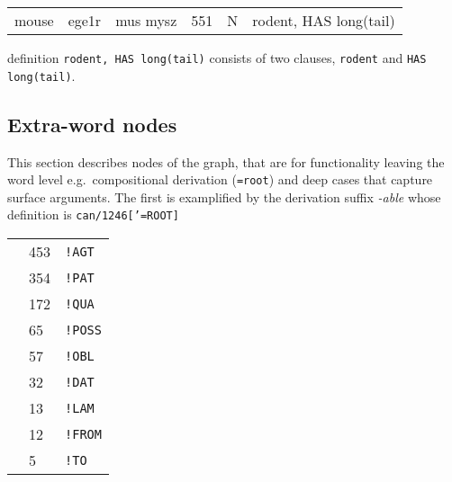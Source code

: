 \documentclass[a4paper,10pt]{article}
\begin{document}
\begin{tabular}{llllll}
mouse	 & ege1r	 & mus mysz	 & 551	 & N	 & rodent, HAS long(tail)
\end{tabular}
definition \texttt{rodent, HAS long(tail)} consists of two clauses, \texttt{rodent} and \texttt{HAS long(tail)}.
\subsection{Extra-word nodes}\label{sec_extraword}
This section describes nodes of the graph, that are for functionality leaving the word level e.g.\ compositional derivation (\texttt{=root}) and deep cases that capture surface arguments. The first is examplified by the derivation suffix \emph{-able} whose definition is \texttt{can/1246['=ROOT]}%
\begin{center}
\begin{tabular}{lll}
\\ & 453	& \texttt{!AGT}
\\ & 354	& \texttt{!PAT}
\\ & 172	& \texttt{!QUA}
\\ & 65	& \texttt{!POSS}
\\ & 57	& \texttt{!OBL}
\\ & 32	& \texttt{!DAT}
\\ & 13	& \texttt{!LAM}
\\ & 12	& \texttt{!FROM}
\\ & 5	& \texttt{!TO}
\end{tabular}
\end{center}


\end{document}
